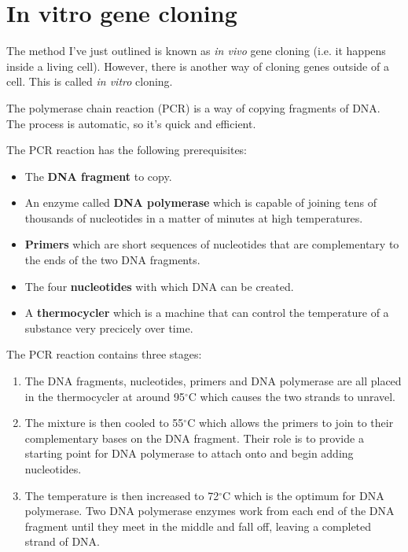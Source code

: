 \documentclass{article}
\begin{document}
\section*{In vitro gene cloning}

The method I've just outlined is known as {\it in vivo} gene cloning (i.e. it
happens inside a living cell). However, there is another way of cloning genes
outside of a cell. This is called {\it in vitro} cloning.

The polymerase chain reaction (PCR) is a way of copying fragments of DNA. The process is automatic, so it's quick and efficient.

The PCR reaction has the following prerequisites:

\begin{itemize}
	
	\item The {\bf DNA fragment} to copy.

	\item An enzyme called {\bf DNA polymerase} which is capable of joining tens
	of thousands of nucleotides in a matter of minutes at high temperatures.

	\item {\bf Primers} which are short sequences of nucleotides that are
	complementary to the ends of the two DNA fragments.

	\item The four {\bf nucleotides} with which DNA can be created.

	\item A {\bf thermocycler} which is a machine that can control the
	temperature of a substance very precicely over time.

\end{itemize}

The PCR reaction contains three stages:

\begin{enumerate}

	\item The DNA fragments, nucleotides, primers and DNA polymerase are all
	placed in the thermocycler at around 95$^\circ$C which causes the two
	strands to unravel.

	\item The mixture is then cooled to 55$^\circ$C which allows the primers to
	join to their complementary bases on the DNA fragment. Their role is to
	provide a starting point for DNA polymerase to attach onto and begin adding
	nucleotides.

	\item The temperature is then increased to 72$^\circ$C which is the optimum
	for DNA polymerase. Two DNA polymerase enzymes work from each end of the
	DNA fragment until they meet in the middle and fall off, leaving a
	completed strand of DNA.

\end{enumerate}
\end{document}
